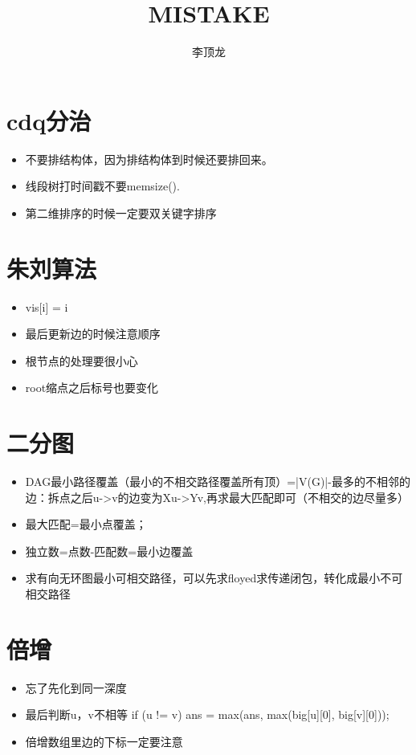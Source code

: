 \documentclass{article}
\title{ \textbf{ MISTAKE}}
\author{ 李顶龙}
\date{}
\begin{document}
\maketitle
\section{ cdq分治}
\begin{itemize}
	\item 不要排结构体，因为排结构体到时候还要排回来。
	\item 线段树打时间戳不要memsize().
	\item 第二维排序的时候一定要双关键字排序
\end{itemize}

\section{ 朱刘算法}

\begin{itemize}

\item vis[i] = i 
\item 最后更新边的时候注意顺序
\item 根节点的处理要很小心
\item root缩点之后标号也要变化

\end{itemize}

\section{二分图}
\begin{itemize}

\item DAG最小路径覆盖（最小的不相交路径覆盖所有顶）=|V(G)|-最多的不相邻的边：拆点之后u->v的边变为Xu->Yv,再求最大匹配即可（不相交的边尽量多）
\item 最大匹配=最小点覆盖；
\item 独立数=点数-匹配数=最小边覆盖
\item 求有向无环图最小可相交路径，可以先求floyed求传递闭包，转化成最小不可相交路径
\end{itemize}

\section{ 倍增}
\begin{itemize}

\item 忘了先化到同一深度
\item 最后判断u，v不相等
if (u != v)
	ans = max(ans, max(big[u][0], big[v][0]));
\item 倍增数组里边的下标一定要注意
\end{itemize}
\end{document}
